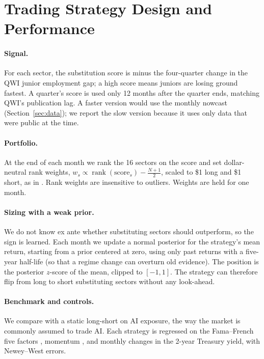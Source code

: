 \section{Trading Strategy Design and Performance}
\label{sec:strategy}

\paragraph{Signal.} For each sector, the substitution score is minus the four-quarter change in the QWI junior employment gap; a high score means juniors are losing ground fastest. A quarter's score is used only 12 months after the quarter ends, matching QWI's publication lag. A faster version would use the monthly nowcast (Section~\ref{sec:data}); we report the slow version because it uses only data that were public at the time.

\paragraph{Portfolio.} At the end of each month we rank the 16 sectors on the score and set dollar-neutral rank weights, $w_{s} \propto \operatorname{rank}(\text{score}_s) - \tfrac{N+1}{2}$, scaled to \$1 long and \$1 short, as in \citet{asness2013value}. Rank weights are insensitive to outliers. Weights are held for one month.

\paragraph{Sizing with a weak prior.} We do not know ex ante whether substituting sectors should outperform, so the sign is learned. Each month we update a normal posterior for the strategy's mean return, starting from a prior centered at zero, using only past returns with a five-year half-life (so that a regime change can overturn old evidence). The position is the posterior $z$-score of the mean, clipped to $[-1, 1]$. The strategy can therefore flip from long to short substituting sectors without any look-ahead.

\paragraph{Benchmark and controls.} We compare with a static long-short on AI exposure, the way the market is commonly assumed to trade AI. Each strategy is regressed on the Fama--French five factors \citep{fama2015five}, momentum \citep{carhart1997persistence}, and monthly changes in the 2-year Treasury yield, with Newey--West errors.

